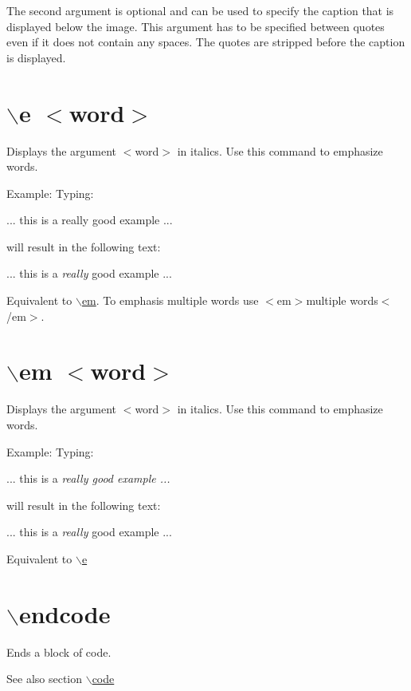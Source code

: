 The second argument is optional and can be used to specify the caption that is displayed below the image. This argument has to be specified between quotes even if it does not contain any spaces. The quotes are stripped before the caption is displayed.



 \hypertarget{commands_cmde}{}\section{$\backslash$e $<$word$>$}\label{commands_cmde}
 Displays the argument $<$word$>$ in italics. Use this command to emphasize words.

\begin{DoxyParagraph}{Example:}
Typing: \begin{DoxyVerb}
  ... this is a \e really good example ... 
  \end{DoxyVerb}
 will result in the following text:\par
\par
 ... this is a {\itshape really\/} good example ...
\end{DoxyParagraph}
Equivalent to \hyperlink{commands_cmdem}{$\backslash$em}. To emphasis multiple words use $<$em$>$multiple words$<$/em$>$.



 \hypertarget{commands_cmdem}{}\section{$\backslash$em $<$word$>$}\label{commands_cmdem}
 Displays the argument $<$word$>$ in italics. Use this command to emphasize words.

\begin{DoxyParagraph}{Example:}
Typing: \begin{DoxyVerb}
  ... this is a \em really good example ... 
  \end{DoxyVerb}
 will result in the following text:\par
\par
 ... this is a {\itshape really\/} good example ...
\end{DoxyParagraph}
Equivalent to \hyperlink{commands_cmde}{$\backslash$e}



 \hypertarget{commands_cmdendcode}{}\section{$\backslash$endcode}\label{commands_cmdendcode}
 Ends a block of code. \begin{DoxySeeAlso}{See also}
section \hyperlink{commands_cmdcode}{$\backslash$code}
\end{DoxySeeAlso}


